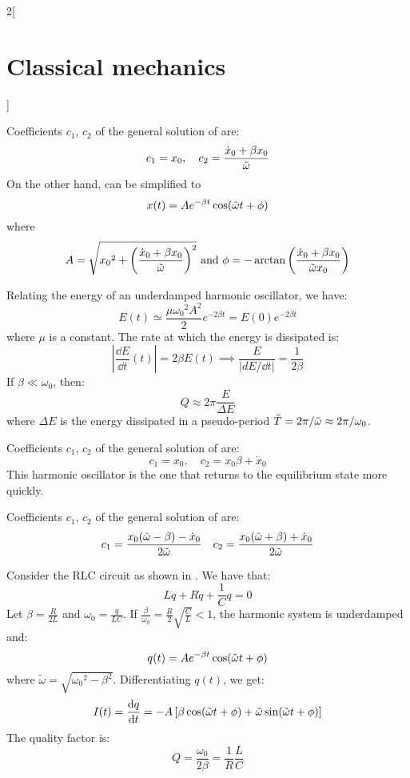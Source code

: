 \documentclass[../../../main_physics.tex]{subfiles}
\begin{document}
\begin{multicols}{2}[\section{Classical mechanics}]
  \begin{proposition}
    Coefficients $c_1$, $c_2$ of the general solution of  are: $$c_1=x_0,\quad c_2=\frac{\dot{x}_0+\beta x_0}{\Tilde{\omega}}$$ On the other hand,  can be simplified to $$x(t)=Ae^{-\beta t}\cos(\Tilde{\omega}t+\phi)$$ where $$A=\sqrt{{x_0}^2+{\left(\frac{\dot{x}_0+\beta x_0}{\Tilde{\omega}}\right)}^2}\text{ and }\phi=-\arctan\left(\frac{\dot{x}_0+\beta x_0}{\Tilde{\omega}x_0}\right)$$
  \end{proposition}
  \begin{proposition}
    Relating the energy of an underdamped harmonic oscillator, we have:
    $$E(t)\simeq\frac{\mu{\omega_0}^2A^2}{2}e^{-2\beta t}=E(0)e^{-2\beta t}$$ where $\mu$ is a constant. The rate at which the energy is dissipated is: $$\left|\frac{\dd{E}}{\dd{t}}(t)\right|=2\beta E(t)\implies\frac{E}{\left|dE/\dd{t}\right|}=\frac{1}{2\beta}$$
    If $\beta\ll\omega_0$, then: $$Q\approx 2\pi\frac{E}{\Delta E}$$ where $\Delta E$ is the energy dissipated in a pseudo-period $\Tilde{T}=2\pi/\Tilde{\omega}\approx2\pi/\omega_0$.
  \end{proposition}
  \begin{proposition}[Critically damped harmonic oscillator: $\beta=\omega_0$]
    Coefficients $c_1$, $c_2$ of the general solution of  are: $$c_1=x_0,\quad c_2=x_0\beta+\dot{x}_0$$ This harmonic oscillator is the one that returns to the equilibrium state more quickly.
  \end{proposition}
  \begin{proposition}
    Coefficients $c_1$, $c_2$ of the general solution of  are: $$c_1=\frac{x_0(\Tilde{\omega}-\beta)-\dot{x}_0}{2\Tilde{\omega}}\quad c_2=\frac{x_0(\Tilde{\omega}+\beta)+\dot{x}_0}{2\Tilde{\omega}}$$
  \end{proposition}
  \begin{proposition}
    Consider the RLC circuit as shown in . We have that:
    $$L\ddot{q}+R\dot{q}+\frac{1}{C}q=0$$ Let $\beta=\frac{R}{2L}$ and $\omega_0=\frac{q}{LC}$. If $\frac{\beta}{\omega_0}=\frac{R}{2}\sqrt{\frac{C}{L}}<1$, the harmonic system is underdamped and: $$q(t)=Ae^{-\beta t}\cos(\Tilde{\omega}t+\phi)$$ where $\tilde{\omega}=\sqrt{{\omega_0}^2-\beta^2}$. Differentiating $q(t)$, we get: $$I(t)=\dv{q}{t}(t)=-A\left[\beta\cos(\Tilde{\omega}t+\phi)+\Tilde{\omega}\sin(\Tilde{\omega}t+\phi)\right]$$ The quality factor is: $$Q=\frac{\omega_0}{2\beta}=\frac{1}{R}\frac{L}{C}$$
    \begin{center}
      \begin{minipage}{\linewidth}
        \centering
        
        \label{CM_RLC}
      \end{minipage}
    \end{center}
  \end{proposition}

\end{multicols}
\end{document}

